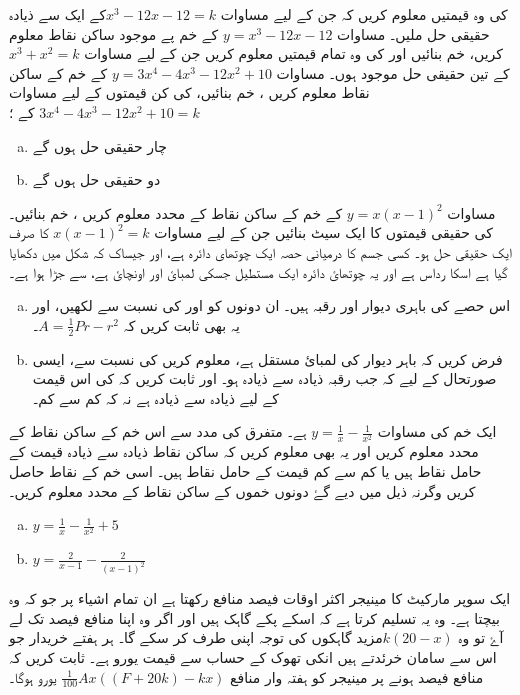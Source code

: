   کی وہ قیمتیں معلوم کریں کہ جن کے لیے مساوات  \( x^3-12x-12=k \)کے ایک سے ذیادہ حقیقی حل ملیں۔
مساوات  \(   y=x^{3}-12x-12\) کے خم پے موجود ساکن نقاط معلوم کریں، خم بنائیں اور   کی وہ تمام قیمتیں معلوم کریں جن کے لیے مساوات \(x^3+x^2=k \) کے تین حقیقی حل موجود ہوں۔
مساوات \( y=3x^4-4x^3-12x^2+10 \) کے خم کے ساکن نقاط معلوم کریں ، خم بنائیں،     کی کن قیمتوں کے لیے مساوات  \( 3x^4-4x^3-12x^2+10=k \) کے ؛
\begin{enumerate}[a.]
\item   چار حقیقی حل ہوں گے
\item  دو حقیقی حل ہوں گے
\end{enumerate}
مساوات \( y=x(x-1)^2 \) کے خم کے ساکن نقاط کے محدد معلوم کریں ، خم بنائیں۔   کی حقیقی قیمتوں کا ایک سیٹ بنائیں جن کے لیے مساوات  \( x(x-1)^2=k \) کا صرف ایک حقیقی حل ہو۔
کسی جسم کا درمیانی حصہ ایک چوتھای دائرہ ہے، اور جیساک کہ شکل میں دکھایا گیا ہے اسکا رداس  ہے اور یہ چوتھائ دائرہ ایک مستطیل جسکی لمبائ   اور اونچائ  ہے، سے جڑا ہوا ہے۔
\begin{enumerate}[a.]
\item  
 اس حصے کی باہری دیوار  اور رقبہ  ہیں۔ ان دونوں کو اور    کی نسبت سے لکھیں، اور یہ بھی ثابت کریں کہ \(A=\frac{1}{2}Pr-r^2 \)۔
\item  
فرض کریں کہ باہر دیوار کی لمبائ مستقل ہے،   معلوم کریں کی نسبت سے، ایسی صورتحال کے لیے کہ جب رقبہ  ذیادہ سے ذیادہ ہو۔ اور ثابت کریں کہ   کی اس قیمت کے لیے  ذیادہ سے ذیادہ ہے نہ کہ کم سے کم۔
 \end{enumerate}
ایک خم کی مساوات \( y=\frac{1}{x}-\frac{1}{x^2} \) ہے۔ متفرق کی مدد سے اس خم کے ساکن نقاط کے محدد معلوم کریں اور یہ بھی معلوم کریں کہ ساکن نقاط ذیادہ سے ذیادہ قیمت کے حامل نقاط ہیں یا کم سے کم قیمت کے حامل نقاط ہیں۔ اسی خم کے نقاط حاصل کریں وگرنہ ذیل میں دیے گۓ دونوں خموں کے ساکن نقاط کے محدد معلوم کریں۔
\begin{enumerate}[a.]
\item \(    y=\frac{1}{x}-\frac{1}{x^2} +5 \)
\item \(  y=\frac{2}{x-1}-\frac{2}{(x-1)^2}  \)
 \end{enumerate}
ایک سوپر مارکیٹ کا مینیجر اکثر اوقات فیصد منافع رکھتا ہے ان تمام اشیاء پر جو کہ وہ بیچتا ہے۔ وہ یہ تسلیم کرتا ہے کہ  اسکے پکے گاہک ہیں اور اگر وہ اپنا منافع   فیصد تک لے آۓ تو وہ \( k(20-x) \)مزید گاہکوں کی توجہ اپنی طرف کر سکے گا۔ ہر ہفتے خریدار جو اس سے سامان خرئدتے ہیں انکی تھوک کے حساب سے قیمت یورو ہے۔ ثابت کریں کہ منافع  فیصد ہونے پر مینیجر کو ہفتہ وار منافع  \( \frac{1}{100}Ax((F+20k)-kx) \) یورو ہوگا۔
